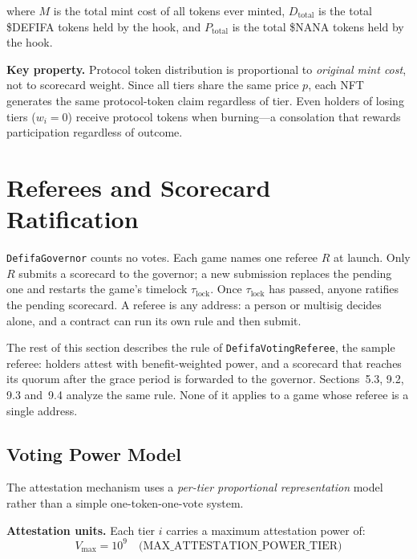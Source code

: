\documentclass[11pt,a4paper]{article}
\begin{document}
where $M$ is the total mint cost of all tokens ever minted, $D_{\text{total}}$ is the total \$DEFIFA tokens held by the hook, and $P_{\text{total}}$ is the total \$NANA tokens held by the hook.

\textbf{Key property.} Protocol token distribution is proportional to \emph{original mint cost}, not to scorecard weight. Since all tiers share the same price $p$, each NFT generates the same protocol-token claim regardless of tier. Even holders of losing tiers ($w_i = 0$) receive protocol tokens when burning---a consolation that rewards participation regardless of outcome.

\section{Referees and Scorecard Ratification}

\texttt{DefifaGovernor} counts no votes. Each game names one referee $R$ at launch. Only $R$ submits a scorecard to the governor; a new submission replaces the pending one and restarts the game's timelock $\tau_{\text{lock}}$. Once $\tau_{\text{lock}}$ has passed, anyone ratifies the pending scorecard. A referee is any address: a person or multisig decides alone, and a contract can run its own rule and then submit.

The rest of this section describes the rule of \texttt{DefifaVotingReferee}, the sample referee: holders attest with benefit-weighted power, and a scorecard that reaches its quorum after the grace period is forwarded to the governor. Sections~5.3, 9.2, 9.3 and~9.4 analyze the same rule. None of it applies to a game whose referee is a single address.

\subsection{Voting Power Model}

The attestation mechanism uses a \emph{per-tier proportional representation} model rather than a simple one-token-one-vote system.

\textbf{Attestation units.} Each tier $i$ carries a maximum attestation power of:
\begin{equation}
V_{\max} = 10^9 \quad \text{(MAX\_ATTESTATION\_POWER\_TIER)}
\end{equation}
\end{document}
